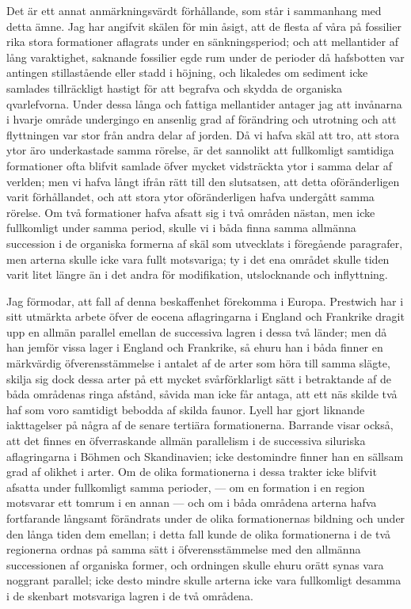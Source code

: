 Det är ett annat anmärkningsvärdt förhållande, som står i sammanhang med detta ämne. Jag har angifvit skälen för min åsigt, att de flesta af våra på fossilier rika stora formationer aflagrats under en sänkningsperiod; och att mellantider af lång varaktighet, saknande fossilier egde rum under de perioder då hafsbotten var antingen stillastående eller stadd i höjning, och likaledes om sediment icke samlades tillräckligt hastigt för att begrafva och skydda de organiska qvarlefvorna. Under dessa långa och fattiga mellantider antager jag att invånarna i hvarje område undergingo en ansenlig grad af förändring och utrotning och att flyttningen var stor från andra delar af jorden. Då vi hafva skäl att tro, att stora ytor äro underkastade samma rörelse, är det sannolikt att fullkomligt samtidiga formationer ofta blifvit samlade öfver mycket vidsträckta ytor i samma delar af verlden; men vi hafva långt ifrån rätt till den slutsatsen, att detta oföränderligen varit förhållandet, och att stora ytor oföränderligen hafva undergått samma rörelse. Om två formationer hafva afsatt sig i två områden nästan, men icke fullkomligt under samma period, skulle vi i båda finna samma allmänna succession i de organiska formerna af skäl som utvecklats i föregående paragrafer, men arterna skulle icke vara fullt motsvariga; ty i det ena området skulle tiden varit litet längre än i det andra för modifikation, utslocknande och inflyttning.

Jag förmodar, att fall af denna beskaffenhet förekomma i Europa. Prestwich har i sitt utmärkta arbete öfver de eocena aflagringarna i England och Frankrike dragit upp en allmän parallel emellan de successiva lagren i dessa två länder; men då han jemför vissa lager i England och Frankrike, så ehuru han i båda finner en märkvärdig öfverensstämmelse i antalet af de arter som höra till samma slägte, skilja sig dock dessa arter på ett mycket svårförklarligt sätt i betraktande af de båda områdenas ringa afstånd, såvida man icke får antaga, att ett näs skilde två haf som voro samtidigt bebodda af skilda faunor. Lyell har gjort liknande iakttagelser på några af de senare tertiära formationerna. Barrande visar också, att det finnes en öfverraskande allmän parallelism i de successiva siluriska aflagringarna i Böhmen och Skandinavien; icke destomindre finner han en sällsam grad af olikhet i arter. Om de olika formationerna i dessa trakter icke blifvit afsatta under fullkomligt samma perioder, — om en formation i en region motsvarar ett tomrum i en annan — och om i båda områdena arterna hafva fortfarande långsamt förändrats under de olika formationernas bildning och under den långa tiden dem emellan; i detta fall kunde de olika formationerna i de två regionerna ordnas på samma sätt i öfverensstämmelse med den allmänna successionen af organiska former, och ordningen skulle ehuru orätt synas vara noggrant parallel; icke desto mindre skulle arterna icke vara fullkomligt desamma i de skenbart motsvariga lagren i de två områdena.

